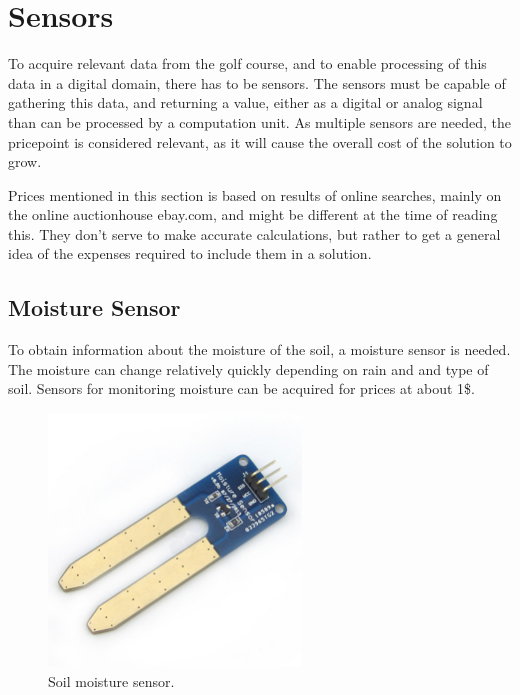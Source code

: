 \section{Sensors}
To acquire relevant data from the golf course, and to enable processing of this data in a digital domain, there has to be sensors. The sensors must be capable of gathering this data, and returning a value, either as a digital or analog signal than can be processed by a computation unit. As multiple sensors are needed, the pricepoint is considered relevant, as it will cause the overall cost of the solution to grow.

Prices mentioned in this section is based on results of online searches, mainly on the online auctionhouse ebay.com, and might be different at the time of reading this. They don't serve to make accurate calculations, but rather to get a general idea of the expenses required to include them in a solution.

\subsection{Moisture Sensor}
To obtain information about the moisture of the soil, a moisture sensor is needed. The moisture can change relatively quickly depending on rain and and type of soil. Sensors for monitoring moisture can be acquired for prices at about 1\$.%

\begin{figure}[H]
\centering
\includegraphics[width=0.6\textwidth]{chapters/analysis/figs/soilMoistureSensor.jpg}
\caption{Soil moisture sensor.}
\label{fig:moistureSensor}
\end{figure}

